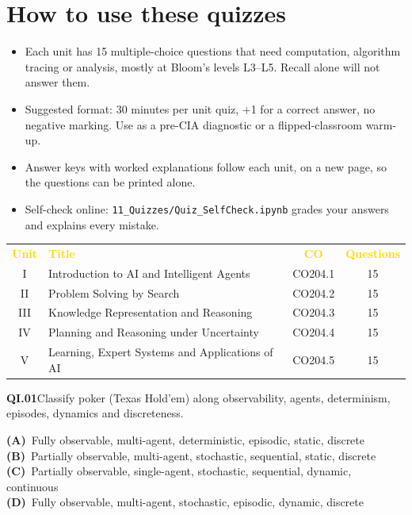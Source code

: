 \documentclass[11pt]{article}
\begin{document}
\section*{How to use these quizzes}
\begin{itemize}\item Each unit has 15 multiple-choice questions that need computation, algorithm tracing or analysis, mostly at Bloom's levels L3--L5. Recall alone will not answer them.
\item Suggested format: 30 minutes per unit quiz, +1 for a correct answer, no negative marking. Use as a pre-CIA diagnostic or a flipped-classroom warm-up.
\item Answer keys with worked explanations follow each unit, on a new page, so the questions can be printed alone.
\item Self-check online: \texttt{11\_Quizzes/Quiz\_SelfCheck.ipynb} grades your answers and explains every mistake.\end{itemize}
\begin{center}\begin{tabular}{c l c c}\rowcolor{navy}\textcolor{gold}{\textbf{Unit}}&\textcolor{gold}{\textbf{Title}}&\textcolor{gold}{\textbf{CO}}&\textcolor{gold}{\textbf{Questions}}\\
I&Introduction to AI and Intelligent Agents&CO204.1&15\\
\rowcolor{ivory}II&Problem Solving by Search&CO204.2&15\\
III&Knowledge Representation and Reasoning&CO204.3&15\\
\rowcolor{ivory}IV&Planning and Reasoning under Uncertainty&CO204.4&15\\
V&Learning, Expert Systems and Applications of AI&CO204.5&15\\
\end{tabular}\end{center}
\newpage
{}
\begin{tcolorbox}[enhanced,breakable,colback=white,colframe=navyL,arc=2mm,boxrule=0.7pt,left=3mm,right=3mm,top=2mm,bottom=2mm]
\textbf{\color{navy}QI.01}\quad Classify poker (Texas Hold'em) along observability, agents, determinism, episodes, dynamics and discreteness.\hfill{}\par\smallskip
{\small \textbf{\color{navyL}(A)}\ Fully observable, multi-agent, deterministic, episodic, static, discrete\\[1pt]\textbf{\color{navyL}(B)}\ Partially observable, multi-agent, stochastic, sequential, static, discrete\\[1pt]\textbf{\color{navyL}(C)}\ Partially observable, single-agent, stochastic, sequential, dynamic, continuous\\[1pt]\textbf{\color{navyL}(D)}\ Fully observable, multi-agent, stochastic, episodic, dynamic, discrete}
\end{tcolorbox}
\end{document}
